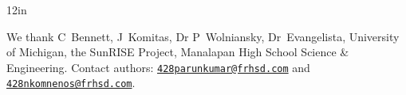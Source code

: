 \documentclass[pdf]{beamer}
\begin{document}
\begin{frame}{}
\begin{columns}[T,totalwidth=\textwidth]
\begin{column}{12in}
\begin{minipage}[t][\textheight]{\linewidth}
\begin{block}{} %
We thank C~Bennett, J~Komitas, Dr P~Wolniansky, Dr~Evangelista, University of Michigan, the SunRISE Project, Manalapan High School Science \& Engineering. Contact authors: \href{mailto:428parunkumar@frhsd.com}{\texttt{428parunkumar@frhsd.com}} and \href{mailto:428nkomnenos@frhsd.com}{\texttt{428nkomnenos@frhsd.com}}.

\begin{minipage}[t][]{11in}
\tiny


\end{minipage}
\end{block}
\end{minipage}
\end{column}
\end{columns}
\end{frame}
\end{document}
